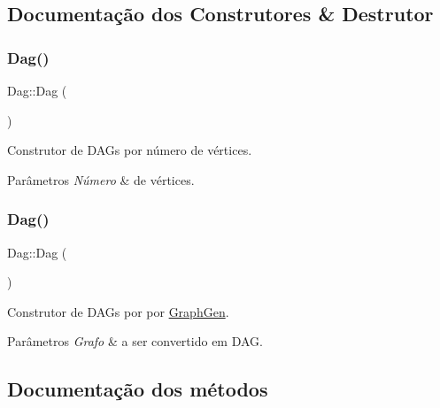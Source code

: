 \subsection{Documentação dos Construtores \& Destrutor}
\mbox{\label{classDag_a60039050421d45ed24d5fff16dd0b4d9}} 
\subsubsection{\texorpdfstring{Dag()}{Dag()}\hspace{0.1cm}{\footnotesize\ttfamily [1/2]}}
{\footnotesize\ttfamily Dag\+::\+Dag (\begin{DoxyParamCaption}\item[{int}]{ }\end{DoxyParamCaption})}

Construtor de D\+A\+Gs por número de vértices. 
\begin{DoxyParams}{Parâmetros}
{\em Número} & de vértices. \\
\hline
\end{DoxyParams}
\mbox{\label{classDag_a7ac03b3c8b13d4a85956eec57a1b8cd3}} 
\subsubsection{\texorpdfstring{Dag()}{Dag()}\hspace{0.1cm}{\footnotesize\ttfamily [2/2]}}
{\footnotesize\ttfamily Dag\+::\+Dag (\begin{DoxyParamCaption}\item[{\mbox{\hyperlink{classGraphGen}{Graph\+Gen}} \&}]{ }\end{DoxyParamCaption})}

Construtor de D\+A\+Gs por por \mbox{\hyperlink{classGraphGen}{Graph\+Gen}}. 
\begin{DoxyParams}{Parâmetros}
{\em Grafo} & a ser convertido em D\+AG. \\
\hline
\end{DoxyParams}


\subsection{Documentação dos métodos}
\mbox{\label{classDag_ac2f36e91443cfeea16640a81865110d2}} 
